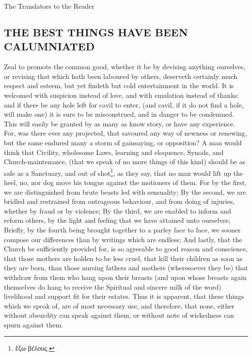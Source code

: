 {}

\begin{center}
    {\LARGE{The Translators to the Reader}}
    \vspace{3mm}
    \par
\end{center}

\onehalfspacing

\subsection{THE BEST THINGS HAVE BEEN CALUMNIATED}

Zeal to promote the common good, whether it be by devising anything ourselves, or revising that which hath been laboured by others, deserveth certainly much respect and esteem, but yet findeth but cold entertainment in the world. It is welcomed with suspicion instead of love, and with emulation instead of thanks: and if there be any hole left for cavil to enter, (and cavil, if it do not find a hole, will make one) it is sure to be misconstrued, and in danger to be condemned. This will easily be granted by as many as know story, or have any experience. For, was there ever any projected, that savoured any way of newness or renewing, but the same endured many a storm of gainsaying, or opposition? A man would think that Civility, wholesome Laws, learning and eloquence, Synods, and Church-maintenance, (that we speak of no more things of this kind) should be as safe as a Sanctuary, and out of shot\footnote{\foreignlanguage{greek}{ἔξω βέλους.}}, as they say, that no man would lift up the heel, no, nor dog move his tongue against the motioners of them. For by the first, we are distinguished from brute beasts led with sensuality; By the second, we are bridled and restrained from outrageous behaviour, and from doing of injuries, whether by fraud or by violence; By the third, we are enabled to inform and reform others, by the light and feeling that we have attained unto ourselves; Briefly, by the fourth being brought together to a parley face to face, we sooner compose our differences than by writings which are endless; And lastly, that the Church be sufficiently provided for, is so agreeable to good reason and conscience, that those mothers are holden to be less cruel, that kill their children as soon as they are born, than those nursing fathers and mothers (wheresoever they be) that withdraw from them who hang upon their breasts (and upon whose breasts again themselves do hang to receive the Spiritual and sincere milk of the word) livelihood and support fit for their estates. Thus it is apparent, that these things which we speak of, are of most necessary use, and therefore, that none, either without absurdity can speak against them, or without note of wickedness can spurn against them.

